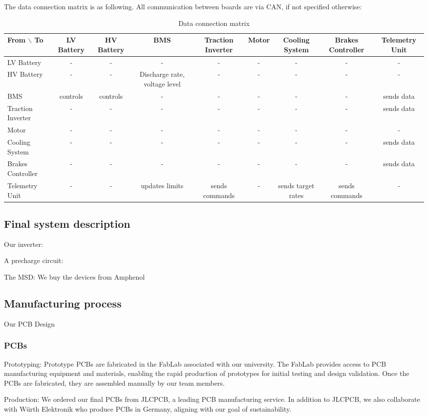 The data connection matrix is as following. All communication between boards are via CAN, if not specified otherwise:

\begin{table}
    \centering
    \begin{adjustbox}{width=\textwidth,center}
    \begin{tabular}{|l|c|c|c|c|c|c|c|c|}
    \hline
    From $\backslash$ To & LV Battery & HV Battery & BMS & Traction Inverter & Motor & Cooling System & Brakes Controller & Telemetry Unit  \\
    \hline
    LV Battery & - & - & - & - & - & - & - & - \\
    HV Battery  & - & - & Discharge rate, voltage level & - & - & - & - & - \\
    BMS & controls & controls & - & - & - & - & - & sends data \\
    Traction Inverter & - & - & - & - & - & - & - & sends data \\
    Motor & - & - & - & - & - & - & - & - \\
    Cooling System & - & - & - & - & - & - & - & sends data \\
    Brakes Controller & - & - & - & - & - & - & - & sends data \\
    Telemetry Unit & - & - & updates limits & sends commands & - & sends target rates & sends commands & - \\
    \hline
    \end{tabular}
    \end{adjustbox}
    \caption{Data connection matrix}
    \label{data-connectivity-matrix}
\end{table}


\subsection{Final system description}
Our inverter:


A precharge circuit:

The MSD: We buy the devices from Amphenol




\subsection{Manufacturing process}
Our PCB Design
\subsubsection{PCBs}
\par Prototyping: Prototype PCBs are fabricated in the FabLab associated with our university. The FabLab provides access to PCB manufacturing equipment and materials, enabling the rapid production of prototypes for initial testing and design validation.
    Once the PCBs are fabricated, they are assembled manually by our team members. 
\par Production: We ordered our final PCBs from JLCPCB, a leading PCB manufacturing service. In addition to JLCPCB, we also collaborate with Würth Elektronik who produce 
PCBs in Germany, aligning with our goal of sustainability.

